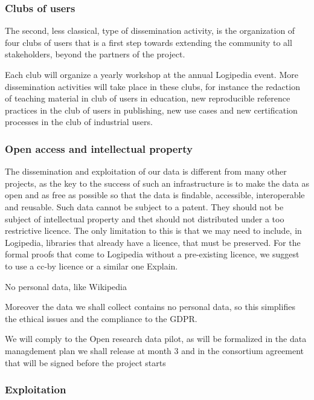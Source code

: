 \subsubsection*{Clubs of users}

The second, less classical, type of dissemination activity, is the
organization of four clubs of users that is a first step towards
extending the community to all stakeholders, beyond the partners of
the project.

Each club will organize a yearly workshop at the annual Logipedia
event. More dissemination activities will take place in these clubs,
for instance the redaction of teaching material in club of users in
education, new reproducible reference practices in the club of users
in publishing, new use cases and new certification processes in the
club of industrial users.

\subsubsection*{Open access and intellectual property}

The dissemination and exploitation of our data is different from many
other projects, as the key to the success of such an infrastructure is
to make the data as open and as free as possible so that the data is
findable, accessible, interoperable and reusable. Such data cannot be
subject to a patent. They should not be subject of intellectual
property and thet should not distributed under a too restrictive
licence.  The only limitation to this is that we may need to include,
in Logipedia, libraries that already have a licence, that must be
preserved.  For the formal proofs that come to Logipedia without a
pre-existing licence, we suggest to use a cc-by licence or a similar
one {\color{red} Explain}.

{\color{red} No personal data, like Wikipedia}

Moreover the data we shall collect contains no personal data, so this
simplifies the ethical issues and the compliance to the GDPR.

We will comply to the Open research data pilot, as will be formalized
in the data managdement plan we shall release at month 3 and in the
consortium agreement that will be signed before the project starts

\subsubsection*{Exploitation}

